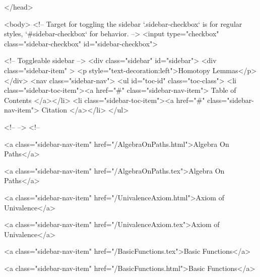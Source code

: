   
</head>




  <body>
    <!-- Target for toggling the sidebar `.sidebar-checkbox` is for regular
     styles, `#sidebar-checkbox` for behavior. -->
<input type="checkbox" class="sidebar-checkbox" id="sidebar-checkbox">

<!-- Toggleable sidebar -->
<div class="sidebar" id="sidebar">
  <div class="sidebar-item" >
    <p style="text-decoration:left">Homotopy Lemmas</p>
  </div>
  <nav class="sidebar-nav">
    <ul id="toc-id" class="toc-class">
  <li class="sidebar-toc-item"><a href="#" class="sidebar-nav-item"> Table of Contents </a></li>
  <li class="sidebar-toc-item"><a href="#" class="sidebar-nav-item"> Citation </a></li>
</ul>


    <!--  -->
    <!-- 
      
    
      
    
      
    
      
        
      
    
      
        
          <a class="sidebar-nav-item" href="/AlgebraOnPaths.html">Algebra On Paths</a>
        
      
    
      
        
          <a class="sidebar-nav-item" href="/AlgebraOnPaths.tex">Algebra On Paths</a>
        
      
    
      
        
          <a class="sidebar-nav-item" href="/UnivalenceAxiom.html">Axiom of Univalence</a>
        
      
    
      
        
          <a class="sidebar-nav-item" href="/UnivalenceAxiom.tex">Axiom of Univalence</a>
        
      
    
      
        
          <a class="sidebar-nav-item" href="/BasicFunctions.tex">Basic Functions</a>
        
      
    
      
        
          <a class="sidebar-nav-item" href="/BasicFunctions.html">Basic Functions</a>
        
      
    
      
        
